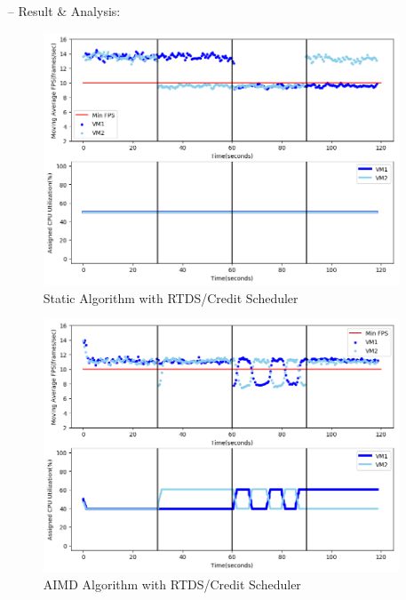 \begin{itemize}
\item[--] Result \& Analysis:\\

\begin{figure}[h!]
\centering
\includegraphics[width=1\linewidth]{images/2vm_static}
\caption{Static Algorithm with RTDS/Credit Scheduler}
\label{2vm_static}
\end{figure}

\begin{figure}[h!]
\centering
\includegraphics[width=1\linewidth]{images/2vm_aimd}
\caption{AIMD Algorithm with RTDS/Credit Scheduler}
\label{2vm_aimd}
\end{figure}


\end{itemize}
